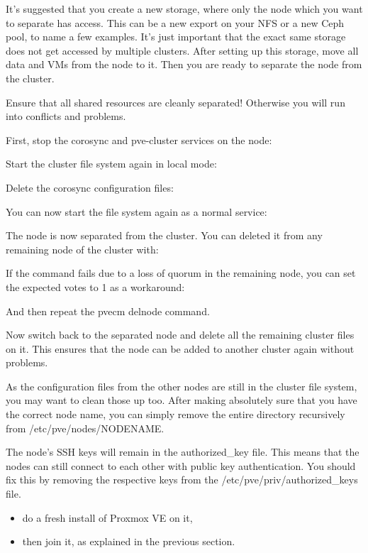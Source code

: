 It’s suggested that you create a new storage, where only the node which you want to separate has access. This can be a new export on your NFS or a new Ceph pool, to name a few examples. It’s just important that the exact same storage does not get accessed by multiple clusters. After setting up this storage, move all data and VMs from the node to it. Then you are ready to separate the node from the cluster.

Ensure that all shared resources are cleanly separated! Otherwise you will run into conflicts and problems.

First, stop the corosync and pve-cluster services on the node:

Start the cluster file system again in local mode:

Delete the corosync configuration files:

You can now start the file system again as a normal service:

The node is now separated from the cluster. You can deleted it from any remaining node of the cluster with:

If the command fails due to a loss of quorum in the remaining node, you can set the expected votes to 1 as a workaround:

And then repeat the pvecm delnode command.

Now switch back to the separated node and delete all the remaining cluster files on it. This ensures that the node can be added to another cluster again without problems.

As the configuration files from the other nodes are still in the cluster file system, you may want to clean those up too. After making absolutely sure that you have the correct node name, you can simply remove the entire directory recursively from /etc/pve/nodes/NODENAME.

The node’s SSH keys will remain in the authorized_key file. This means that the nodes can still connect to each other with public key authentication. You should fix this by removing the respective keys from the /etc/pve/priv/authorized_keys file.

\begin{itemize}[leftmargin=2cm]

	\item do a fresh install of Proxmox VE on it,

	\item then join it, as explained in the previous section.

\end{itemize}

